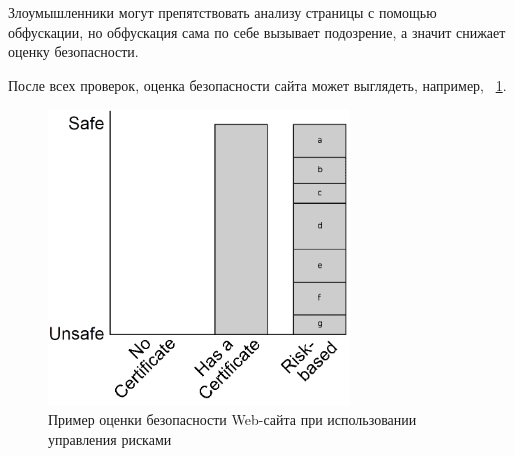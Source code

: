 \documentclass[10pt, a5paper]{article}
\begin{document}
Злоумышленники могут препятствовать анализу страницы с помощью
обфускации, но обфускация сама по себе вызывает подозрение, а значит
снижает оценку безопасности.

После всех проверок, оценка безопасности сайта может выглядеть,
например, ~\ref{Hlebnikov7}.

\begin{center}
\begin{figure}[h!]
  \centering
  \includegraphics[width=8cm]{Hlebnikov7.png}
  \caption{Пример оценки безопасности Web-сайта при использовании управления рисками}
  \label{Hlebnikov7}
\end{figure}
\end{center}
\end{document}
